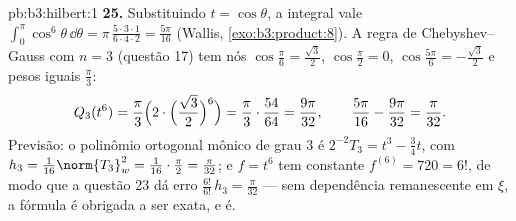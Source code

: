 \begin{solution}{pb:b3:hilbert:1}
\textbf{25.} Substituindo $t = \cos\theta$, a integral vale
$\int_0^\pi\cos^6\theta\,\dd\theta =
\pi\,\frac{5\cdot3\cdot1}{6\cdot4\cdot2} = \frac{5\pi}{16}$
(Wallis, \cref{exo:b3:product:8}). A regra de
Chebyshev--Gauss com $n = 3$ (questão 17) tem nós
$\cos\frac\pi6 = \frac{\sqrt3}2$, $\cos\frac\pi2 = 0$,
$\cos\frac{5\pi}6 = -\frac{\sqrt3}2$ e pesos iguais
$\frac\pi3$:
\[
Q_3(t^6) = \frac\pi3\Bigl(2\cdot\Bigl(\frac{\sqrt3}2
\Bigr)^{6}\Bigr) = \frac\pi3\cdot\frac{54}{64}
= \frac{9\pi}{32},
\qquad
\frac{5\pi}{16} - \frac{9\pi}{32} = \frac\pi{32} .
\]
Previsão: o polinômio ortogonal mônico de grau $3$ é
$2^{-2}T_3 = t^3 - \frac34t$, com $h_3 =
\frac1{16}\norm{T_3}_w^2 = \frac1{16}\cdot\frac\pi2 =
\frac\pi{32}$; e $f = t^6$ tem constante $f^{(6)} = 720 =
6!$, de modo que a questão 23 dá erro $\frac{6!}{6!}\,h_3 =
\frac\pi{32}$ --- sem dependência remanescente em $\xi$, a
fórmula é obrigada a ser exata, e é.
\end{solution}
